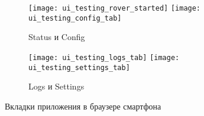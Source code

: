 \begin{figure}
  \begin{subfigure}{\linewidth}
    \center
    \texttt{[image: ui\_testing\_rover\_started]}
    \texttt{[image: ui\_testing\_config\_tab]}
    \caption{Status и Config}
  \end{subfigure}\par\medskip
  \begin{subfigure}{\linewidth}
    \center
    \texttt{[image: ui\_testing\_logs\_tab]}
    \texttt{[image: ui\_testing\_settings\_tab]}
    \caption{Logs и Settings}
  \end{subfigure}\par\medskip
  \caption{Вкладки приложения в браузере смартфона}
  \label{img:all_tabs1}
\end{figure}















